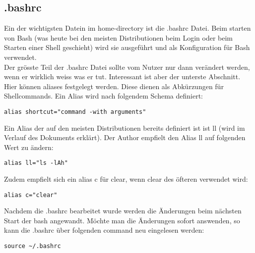 \subsection{.bashrc}
Ein der wichtigsten Datein im home-directory ist die .bashrc Datei. Beim starten von Bash (was heute bei den meisten Distributionen beim Login oder beim Starten einer Shell geschieht) wird sie ausgef\"uhrt und als Konfiguration f\"ur Bash verwendet.\\
Der gr\"osste Teil der .bashrc Datei sollte vom Nutzer nur dann ver\"andert werden, wenn er wirklich weiss was er tut. Interessant ist aber der unterste Abschnitt. Hier k\"onnen aliases festgelegt werden. Diese dienen als Abk\"urzungen f\"ur Shellcommands. Ein Alias wird nach folgendem Schema definiert:
\begin{lstlisting}
alias shortcut="command -with arguments"
\end{lstlisting}
Ein Alias der auf den meisten Distributionen bereits definiert ist ist ll (wird im Verlauf des Dokuments erkl\"art). Der Author empfielt den Alias ll auf folgenden Wert zu \"andern:
\begin{lstlisting}
alias ll="ls -lAh"
\end{lstlisting}
Zudem empfielt sich ein alias c f\"ur clear, wenn clear des \"ofteren verwendet wird:
\begin{lstlisting}
alias c="clear"
\end{lstlisting}
Nachdem die .bashrc bearbeitet wurde werden die \"Anderungen beim n\"achsten Start der bash angewandt. M\"ochte man die \"Anderungen sofort answenden, so kann die .bashrc \"uber folgenden command neu eingelesen werden:
\begin{lstlisting}
source ~/.bashrc
\end{lstlisting}
